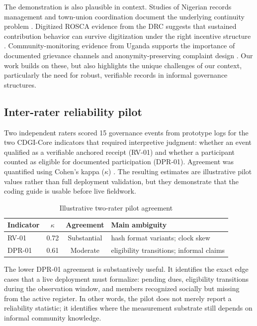 \documentclass[review,onecolumn]{elsarticle}
\begin{document}
The demonstration is also plausible in context. Studies of Nigerian records management and town-union coordination document the underlying continuity problem \cite{abioye2007, honey1998}. Digitized ROSCA evidence from the DRC suggests that sustained contribution behavior can survive digitization under the right incentive structure \cite{chioda2021}. Community-monitoring evidence from Uganda supports the importance of documented grievance channels and anonymity-preserving complaint design \cite{bjorkman2009}. Our work builds on these, but also highlights the unique challenges of our context, particularly the need for robust, verifiable records in informal governance structures.

\subsection{Inter-rater reliability pilot}

Two independent raters scored 15 governance events from prototype logs for the two CDGI-Core indicators that required interpretive judgment: whether an event qualified as a verifiable anchored receipt (RV-01) and whether a participant counted as eligible for documented participation (DPR-01). Agreement was quantified using Cohen's kappa ($\kappa$) \cite{cohen1960}. The resulting estimates are illustrative pilot values rather than full deployment validation, but they demonstrate that the coding guide is usable before live fieldwork.

\begin{table}[t]
\caption{Illustrative two-rater pilot agreement}
\label{tab:kappa}
\small
\begin{tabularx}{\columnwidth}{l c c X}
\toprule
Indicator & $\kappa$ & Agreement & Main ambiguity \\
\midrule
RV-01 & 0.72 & Substantial & hash format variants; clock skew \\
DPR-01 & 0.61 & Moderate & eligibility transitions; informal claims \\
\bottomrule
\end{tabularx}
\end{table}

The lower DPR-01 agreement is substantively useful. It identifies the exact edge cases that a live deployment must formalize: pending dues, eligibility transitions during the observation window, and members recognized socially but missing from the active register. In other words, the pilot does not merely report a reliability statistic; it identifies where the measurement substrate still depends on informal community knowledge.
\end{document}
